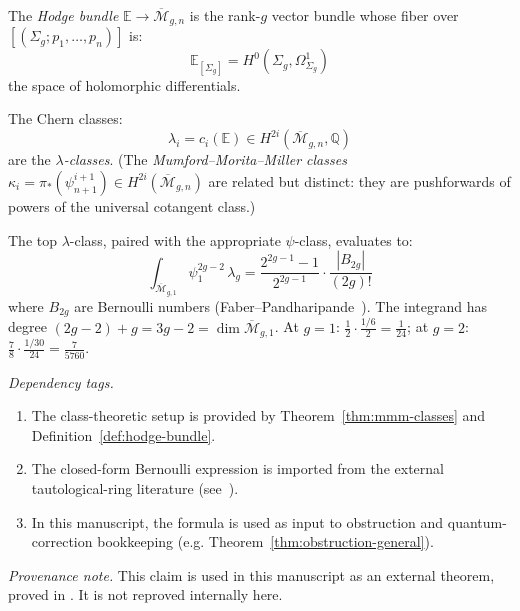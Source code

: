 \begin{definition}
\label{def:hodge-bundle}
The \emph{Hodge bundle} $\mathbb{E} \to \overline{\mathcal{M}}_{g,n}$ is the rank-$g$ vector bundle whose fiber over $[(\Sigma_g; p_1, \ldots, p_n)]$ is:
\begin{equation}
\mathbb{E}_{[\Sigma_g]} = H^0(\Sigma_g, \Omega^1_{\Sigma_g})
\end{equation}
the space of holomorphic differentials.

The Chern classes:
\begin{equation}
\lambda_i = c_i(\mathbb{E}) \in H^{2i}(\overline{\mathcal{M}}_{g,n}, \mathbb{Q})
\end{equation}
are the \emph{$\lambda$-classes}. (The \emph{Mumford--Morita--Miller classes} $\kappa_i = \pi_*(\psi_{n+1}^{i+1}) \in H^{2i}(\overline{\mathcal{M}}_{g,n})$ are related but distinct: they are pushforwards of powers of the universal cotangent class.)
\end{definition}

\begin{theorem}
\label{thm:mumford-formula}
The top $\lambda$-class, paired with the appropriate $\psi$-class, evaluates to:
\begin{equation}\label{eq:faber-pandharipande}
\int_{\overline{\mathcal{M}}_{g,1}} \psi_1^{2g-2}\,\lambda_g = \frac{2^{2g-1}-1}{2^{2g-1}} \cdot \frac{|B_{2g}|}{(2g)!}
\end{equation}
where $B_{2g}$ are Bernoulli numbers (Faber--Pandharipande~\cite{FP00}).  The integrand has degree $(2g-2)+g = 3g-2 = \dim\overline{\mathcal{M}}_{g,1}$.  At $g = 1$: $\frac{1}{2} \cdot \frac{1/6}{2} = \frac{1}{24}$; at $g = 2$: $\frac{7}{8} \cdot \frac{1/30}{24} = \frac{7}{5760}$.
\end{theorem}

\begin{remark}
\emph{Dependency tags.}
\begin{enumerate}[label=(D\arabic*)]
\item The class-theoretic setup is provided by
Theorem~\ref{thm:mmm-classes} and Definition~\ref{def:hodge-bundle}.
\item The closed-form Bernoulli expression is imported from the external
tautological-ring literature (see~\cite{Mumford83}).
\item In this manuscript, the formula is used as input to obstruction and
quantum-correction bookkeeping (e.g. Theorem~\ref{thm:obstruction-general}).
\end{enumerate}
\emph{Provenance note.}
This claim is used in this manuscript as an external theorem, proved in
\cite{Mumford83}. It is not reproved internally here.
\end{remark}

